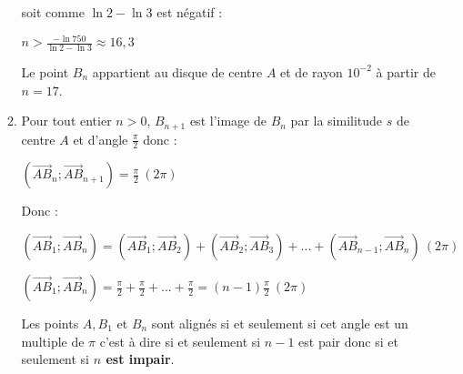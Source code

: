 \begin{corrige}
\begin{enumerate}
\begin{enumerate}
               soit comme $\ln2-\ln3$ est négatif :
               \par
               $n > \frac{-\ln750}{\ln2-\ln3}\approx 16,3$
               \par
               Le point $B_n$ appartient au disque de centre $A$ et de rayon $10^{-2}$ à partir de $n=17$.
               \item
               Pour tout entier $n > 0 $, $B_{n+1}$ est l'image de $B_n$ par la similitude $s$ de centre $A$ et d'angle $\frac{\pi }{2}$ donc :
               \par
               $\left(\overrightarrow{AB}_{n};\overrightarrow{AB}_{n+1}\right)=\frac{\pi }{2} \  \left(2\pi \right)$
               \par
               Donc :
               \par
               $\left(\overrightarrow{AB}_{1};\overrightarrow{AB}_{n}\right)=\left(\overrightarrow{AB}_{1};\overrightarrow{AB}_{2}\right)+\left(\overrightarrow{AB}_{2};\overrightarrow{AB}_{3}\right)+. . .+\left(\overrightarrow{AB}_{n-1};\overrightarrow{AB}_{n}\right)\ \left(2\pi \right)$
               \par
               $\left(\overrightarrow{AB}_{1};\overrightarrow{AB}_{n}\right)=\frac{\pi }{2}+\frac{\pi }{2} +. . .+\frac{\pi }{2}=\left(n-1\right)\frac{\pi }{2}\ \left(2\pi \right)$
               \par
               Les points $A, B_1$ et $B_n$ sont alignés si et seulement si cet angle est un multiple de $\pi $ c'est à dire si et seulement si $n-1$ est pair donc si et seulement si \textbf{$n$ est impair}.
          \end{enumerate}
     \end{enumerate}
\end{corrige}

